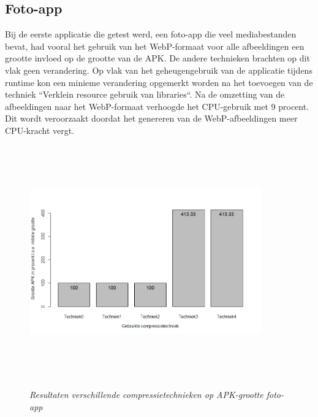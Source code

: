 \subsection{Foto-app}
Bij de eerste applicatie die getest werd, een foto-app die veel mediabestanden bevat, had vooral het gebruik van het WebP-formaat voor alle afbeeldingen een grootte invloed op de grootte van de APK. De andere technieken brachten op dit vlak geen verandering. Op vlak van het geheugengebruik van de applicatie tijdens runtime kon een minieme verandering opgemerkt worden na het toevoegen van de techniek ``Verklein resource gebruik van libraries``. Na de omzetting van de afbeeldingen naar het WebP-formaat verhoogde het CPU-gebruik met 9 procent. Dit wordt veroorzaakt doordat het genereren van de WebP-afbeeldingen meer CPU-kracht vergt.
\begin{figure}[H]
	\centering
	\caption{\textit{Resultaten verschillende compressietechnieken op APK-grootte foto-app}}
	\includegraphics[width=10cm, height=10cm, keepaspectratio]{img/Rplot01}\\[.5cm]
	
\end{figure}

